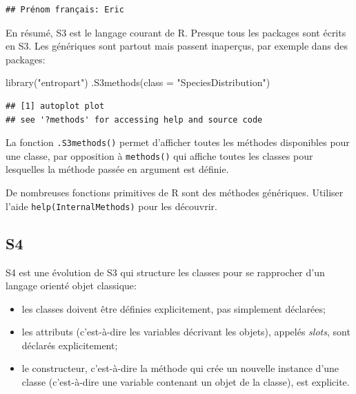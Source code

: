 \documentclass[
  11pt,
  french,
  a4paper,
  extrafontsizes,onecolumn,openright
  ]{memoir}
\newenvironment{Shaded}{\begin{snugshade}}{\end{snugshade}}
\newcommand{\AttributeTok}[1]{\textcolor[rgb]{0.77,0.63,0.00}{#1}}
\newcommand{\FunctionTok}[1]{\textcolor[rgb]{0.00,0.00,0.00}{#1}}
\newcommand{\NormalTok}[1]{#1}
\newcommand{\StringTok}[1]{\textcolor[rgb]{0.31,0.60,0.02}{#1}}
\providecommand{\tightlist}{%
  \setlength{\itemsep}{0pt}\setlength{\parskip}{0pt}}
\begin{document}
\begin{verbatim}
## Prénom français: Eric
\end{verbatim}

\normalsize

En résumé, S3 est le langage courant de R.
Presque tous les packages sont écrits en S3.
Les génériques sont partout mais passent inaperçus, par exemple dans des packages:

\scriptsize

\begin{Shaded}
\begin{Highlighting}[]
\FunctionTok{library}\NormalTok{(}\StringTok{"entropart"}\NormalTok{)}
\FunctionTok{.S3methods}\NormalTok{(}\AttributeTok{class =} \StringTok{"SpeciesDistribution"}\NormalTok{)}
\end{Highlighting}
\end{Shaded}

\begin{verbatim}
## [1] autoplot plot    
## see '?methods' for accessing help and source code
\end{verbatim}

\normalsize
La fonction \texttt{.S3methods()} permet d'afficher toutes les méthodes disponibles pour une classe, par opposition à \texttt{methods()} qui affiche toutes les classes pour lesquelles la méthode passée en argument est définie.

De nombreuses fonctions primitives de R sont des méthodes génériques.
Utiliser l'aide \texttt{help(InternalMethods)} pour les découvrir.

\hypertarget{s4}{%
\subsection{S4}\label{s4}}

S4 est une évolution de S3 qui structure les classes pour se rapprocher d'un langage orienté objet classique:

\begin{itemize}
\tightlist
\item
  les classes doivent être définies explicitement, pas simplement déclarées;
\item
  les attributs (c'est-à-dire les variables décrivant les objets), appelés \emph{slots}, sont déclarés explicitement;
\item
  le constructeur, c'est-à-dire la méthode qui crée un nouvelle instance d'une classe (c'est-à-dire une variable contenant un objet de la classe), est explicite.
\end{itemize}
\end{document}
